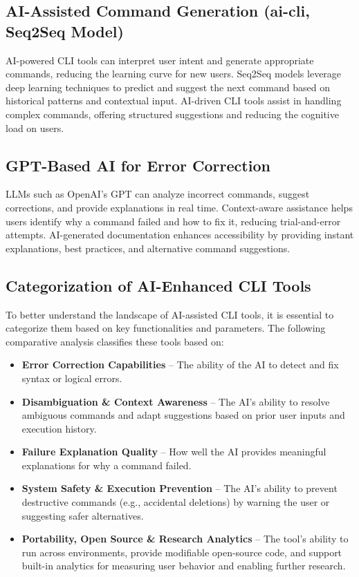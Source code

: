 \subsection{AI-Assisted Command Generation (ai-cli, Seq2Seq Model)}

AI-powered CLI tools can interpret user intent and generate appropriate commands, reducing the learning curve for new users. Seq2Seq models leverage deep learning techniques to predict and suggest the next command based on historical patterns and contextual input. AI-driven CLI tools assist in handling complex commands, offering structured suggestions and reducing the cognitive load on users.

\subsection{GPT-Based AI for Error Correction}

LLMs such as OpenAI's GPT can analyze incorrect commands, suggest corrections, and provide explanations in real time. Context-aware assistance helps users identify why a command failed and how to fix it, reducing trial-and-error attempts. AI-generated documentation enhances accessibility by providing instant explanations, best practices, and alternative command suggestions.

\subsection{Categorization of AI-Enhanced CLI Tools}

To better understand the landscape of AI-assisted CLI tools, it is essential to categorize them based on key functionalities and parameters. The following comparative analysis classifies these tools based on:

\begin{itemize}
	\item \textbf{Error Correction Capabilities} – The ability of the AI to detect and fix syntax or logical errors.
	\item \textbf{Disambiguation \& Context Awareness} – The AI's ability to resolve ambiguous commands and adapt suggestions based on prior user inputs and execution history.
	\item \textbf{Failure Explanation Quality} – How well the AI provides meaningful explanations for why a command failed.
	\item \textbf{System Safety \& Execution Prevention} – The AI's ability to prevent destructive commands (e.g., accidental deletions) by warning the user or suggesting safer alternatives.
	\item \textbf{Portability, Open Source \& Research Analytics} – The tool's ability to run across environments, provide modifiable open-source code, and support built-in analytics for measuring user behavior and enabling further research.
\end{itemize}

